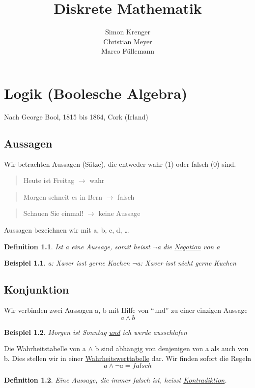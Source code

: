 \documentclass{report}
\title{Diskrete Mathematik}
\author{Simon Krenger\\Christian Meyer\\Marco Füllemann}
\newtheorem{mydef}{Definition}
\newtheorem{myexample}{Beispiel}
\begin{document}
\maketitle
\chapter{Logik (Boolesche Algebra)}
Nach George Bool, 1815 bis 1864, Cork (Irland)
\section{Aussagen}
Wir betrachten Aussagen (Sätze), die entweder wahr (1) oder falsch (0) sind.

\begin{quote}Heute ist Freitag \(\to\) wahr\end{quote}
\begin{quote}Morgen schneit es in Bern \(\to\) falsch\end{quote}
\begin{quote}Schauen Sie einmal! \(\to\) keine Aussage\end{quote}
Aussagen bezeichnen wir mit a, b, c, d, …
\begin{mydef}
Ist a eine Aussage, somit heisst  \(\lnot\)a die \underline{Negation} von a
\end{mydef}
\begin{myexample}a: Xaver isst gerne Kuchen
\(\lnot\)a: Xaver isst nicht gerne Kuchen\end{myexample}

\section{Konjunktion}
Wir verbinden zwei Aussagen a, b mit Hilfe von “und” zu einer einzigen Aussage
\begin{equation}a \land b\end{equation}
\begin{myexample}Morgen ist Sonntag \underline{und} ich werde ausschlafen\end{myexample}

Die Wahrheitstabelle von a \(\land\) b sind abhängig von denjenigen von a als auch von b. Dies stellen wir in einer \underline{Wahrheitswerttabelle} dar. Wir finden sofort die Regeln
\begin{equation}a \land \lnot a = falsch\end{equation}


\begin{mydef}Eine Aussage, die immer falsch ist, heisst \underline{Kontradiktion}.\end{mydef}
\end{document}
